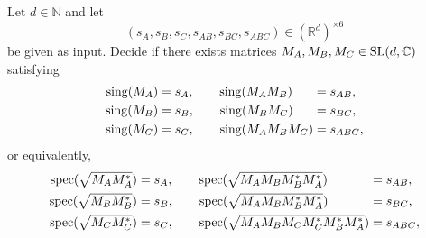 \documentclass[notitlepage]{article}
\begin{document}
\begin{prob}
    Let $d \in \mathbb N$ and let
    \begin{equation}
        (s_{A}, s_{B}, s_{C}, s_{AB}, s_{BC}, s_{ABC}) \in (\mathbb R^{d})^{\times 6}
    \end{equation}
    be given as input.
    Decide if there exists matrices $M_{A}, M_{B}, M_{C} \in \operatorname{SL}(d,\mathbb C)$ satisfying
    \begin{equation}
        \begin{alignedat}{2}
            \operatorname{sing}(M_A) &= s_{A}, \qquad \operatorname{sing}(M_AM_B) &&= s_{AB}, \\
            \operatorname{sing}(M_B) &= s_{B}, \qquad \operatorname{sing}(M_BM_C) &&= s_{BC}, \\
            \operatorname{sing}(M_C) &= s_{C}, \qquad \operatorname{sing}(M_AM_BM_C) &&= s_{ABC},
        \end{alignedat}
    \end{equation}
    or equivalently,
    \begin{equation}
        \begin{alignedat}{2}
            \operatorname{spec}(\sqrt{M_AM_A^{*}}) &= s_{A}, \qquad \operatorname{spec}(\sqrt{M_AM_BM_B^{*}M_{A}^{*}}) &&= s_{AB}, \\
            \operatorname{spec}(\sqrt{M_BM_B^{*}}) &= s_{B}, \qquad \operatorname{spec}(\sqrt{M_AM_BM_B^{*}M_{A}^{*}}) &&= s_{BC}, \\
            \operatorname{spec}(\sqrt{M_CM_C^{*}}) &= s_{C}, \qquad \operatorname{spec}(\sqrt{M_AM_BM_CM_C^{*}M_B^{*}M_{A}^{*}}) &&= s_{ABC},
        \end{alignedat}
    \end{equation}
\end{prob}

\printbibliography
% 
% 

\end{document}
